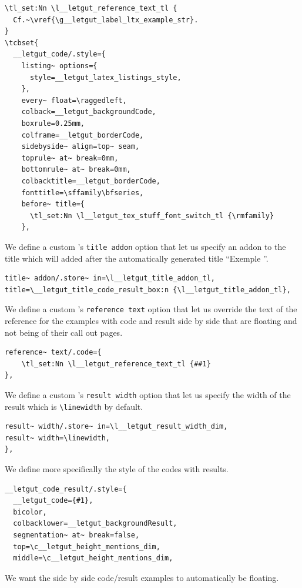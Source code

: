 \documentclass{letgut}
\begin{document}
\begin{lstlisting}
\tl_set:Nn \l__letgut_reference_text_tl {
  Cf.~\vref{\g__letgut_label_ltx_example_str}.
}
\tcbset{
  __letgut_code/.style={
    listing~ options={
      style=__letgut_latex_listings_style,
    },
    every~ float=\raggedleft,
    colback=__letgut_backgroundCode,
    boxrule=0.25mm,
    colframe=__letgut_borderCode,
    sidebyside~ align=top~ seam,
    toprule~ at~ break=0mm,
    bottomrule~ at~ break=0mm,
    colbacktitle=__letgut_borderCode,
    fonttitle=\sffamily\bfseries,
    before~ title={
      \tl_set:Nn \l__letgut_tex_stuff_font_switch_tl {\rmfamily}
    },
\end{lstlisting}
We define a custom 's \lstinline+title addon+ option that let us
specify an addon to the title which will added after the automatically
generated title “Exemple ”.
\begin{lstlisting}
title~ addon/.store~ in=\l__letgut_title_addon_tl,
title=\__letgut_title_code_result_box:n {\l__letgut_title_addon_tl},
\end{lstlisting}
We define a custom 's \lstinline+reference text+ option that let us
override the text of the reference for the examples with code and result side by
side that are floating and not being of their call out pages.
\begin{lstlisting}
reference~ text/.code={
    \tl_set:Nn \l__letgut_reference_text_tl {##1}
},
\end{lstlisting}
We define a custom 's \lstinline+result width+ option that let us
specify the width of the result which is \lstinline+\linewidth+ by default.
\begin{lstlisting}
result~ width/.store~ in=\l__letgut_result_width_dim,
result~ width=\linewidth,
},
\end{lstlisting}
We define more specifically the style of the codes with results.
\begin{lstlisting}
__letgut_code_result/.style={
  __letgut_code={#1},
  bicolor,
  colbacklower=__letgut_backgroundResult,
  segmentation~ at~ break=false,
  top=\c__letgut_height_mentions_dim,
  middle=\c__letgut_height_mentions_dim,
\end{lstlisting}
We want the side by side code/result examples to automatically be floating.
\end{document}
